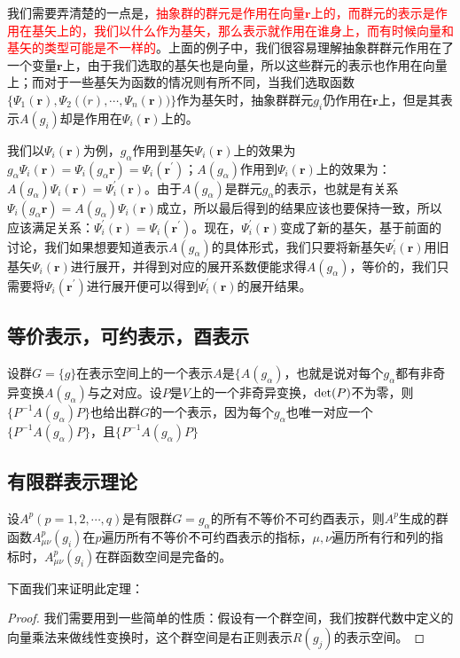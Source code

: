 我们需要弄清楚的一点是，\textcolor{red}{抽象群的群元是作用在向量$\bm{r}$上的，而群元的表示是作用在基矢上的，我们以什么作为基矢，那么表示就作用在谁身上，而有时候向量和基矢的类型可能是不一样的}。上面的例子中，我们很容易理解抽象群群元作用在了一个变量$\bm{r}$上，由于我们选取的基矢也是向量，所以这些群元的表示也作用在向量上；而对于一些基矢为函数的情况则有所不同，当我们选取函数$\{\Psi_1(\bm{r}), \Psi_2(\bm(r), \cdots, \Psi_n(\bm{r}))\}$作为基矢时，抽象群群元$g_i$仍作用在$\bm{r}$上，但是其表示$A(g_i)$却是作用在$\Psi_i(\bm{r})$上的。

我们以$\Psi_i(\bm{r})$为例，$g_\alpha$作用到基矢$\Psi_i(\bm{r})$上的效果为$ g_\alpha \Psi_i(\bm{r}) =\Psi_i(g_\alpha \bm{r}) = \Psi_i(\bm{r}^{\prime})$；$A(g_\alpha)$作用到$\Psi_i(\bm{r})$上的效果为：$ A(g_\alpha)\Psi_i(\bm{r}) = \Psi_i^{\prime}(\bm{r})$。由于$A(g_\alpha)$是群元$g_\alpha$的表示，也就是有关系$\Psi_i(g_\alpha \bm{r}) = A(g_\alpha)\Psi_i(\bm{r})$成立，所以最后得到的结果应该也要保持一致，所以应该满足关系：$\Psi_i^\prime(\bm{r}) = \Psi_i(\bm{r}^\prime)$。现在，$\Psi^\prime_i(\bm{r})$变成了新的基矢，基于前面的讨论，我们如果想要知道表示$A(g_\alpha)$的具体形式，我们只要将新基矢$\Psi_i^{\prime}(\bm{r})$用旧基矢$\Psi_i(\bm{r})$进行展开，并得到对应的展开系数便能求得$A(g_\alpha)$，等价的，我们只需要将$\Psi_i(\bm{r}^\prime)$进行展开便可以得到$\Psi^\prime_i(\bm{r})$的展开结果。

\subsection{等价表示，可约表示，酉表示}
\begin{definition}[等价表示]
	设群$G=\{g\}$在表示空间上的一个表示$A$是$\{A(g_\alpha)$，也就是说对每个$g_\alpha$都有非奇异变换$A(g_\alpha)$与之对应。设$P$是$V$上的一个非奇异变换，${\rm det}(P)$不为零，则$\{P^{-1} A(g_\alpha) P\}$也给出群$G$的一个表示，因为每个$g_\alpha$也唯一对应一个$\{P^{-1}A(g_\alpha)P\}$，且$\{P^{-1}A(g_\alpha)P\}$
\end{definition}

\subsection{有限群表示理论}
\begin{theorem}[完备性定理]
	设$A^{p}(p = 1, 2, \cdots, q)$是有限群$G = {g_{\alpha}}$的所有不等价不可约酉表示，则$A^{p}$生成的群函数$A^{p}_{\mu\nu}(g_{i})$在$p$遍历所有不等价不可约酉表示的指标，$\mu, \nu$遍历所有行和列的指标时，$A^{p}_{\mu\nu}(g_{i})$在群函数空间是完备的。
\end{theorem} 
下面我们来证明此定理：
\begin{proof}
	我们需要用到一些简单的性质：假设有一个群空间，我们按群代数中定义的向量乘法来做线性变换时，这个群空间是右正则表示$R(g_j)$的表示空间。
\end{proof}

